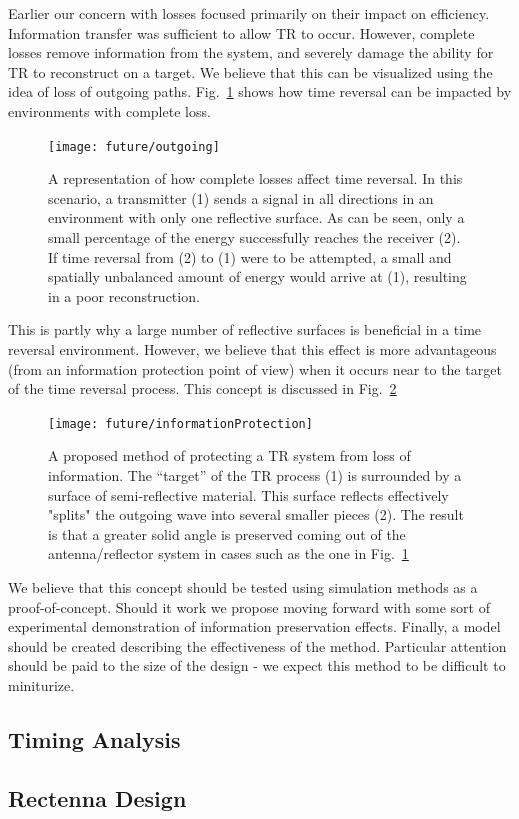 Earlier our concern with losses focused primarily on their impact on efficiency. Information transfer was sufficient to allow TR to occur. However, complete losses remove information from the system, and severely damage the ability for TR to reconstruct on a target. We believe that this can be visualized using the idea of loss of outgoing paths. Fig.~\ref{fig:outgo} shows how time reversal can be impacted by environments with complete loss.

\begin{figure}[h]
\texttt{[image: future/outgoing]}
\caption[Example of information loss on time reversal efficacy]{A representation of how complete losses affect time reversal. In this scenario, a transmitter (1) sends a signal in all directions in an environment with only one reflective surface. As can be seen, only a small percentage of the energy successfully reaches the receiver (2). If time reversal from (2) to (1) were to be attempted, a small and spatially unbalanced amount of energy would arrive at (1), resulting in a poor reconstruction.}
\label{fig:outgo}
\end{figure}

This is partly why a large number of reflective surfaces is beneficial in a time reversal environment. However, we believe that this effect is more advantageous (from an information protection point of view) when it occurs near to the target of the time reversal process. This concept is discussed in Fig.~\ref{fig:infoProtection}

\begin{figure}[h]
\texttt{[image: future/informationProtection]}
\caption[Proposed TR information protection system]{A proposed method of protecting a TR system from loss of information. The ``target'' of the TR process (1) is surrounded by a surface of semi-reflective material. This surface reflects effectively "splits" the outgoing wave into several smaller pieces (2). The result is that a greater solid angle is preserved coming out of the antenna/reflector system in cases such as the one in Fig.~\ref{fig:outgo}}
\label{fig:infoProtection}
\end{figure}

We believe that this concept should be tested using simulation methods as a proof-of-concept. Should it work we propose moving forward with some sort of experimental demonstration of information preservation effects. Finally, a model should be created describing the effectiveness of the method. Particular attention should be paid to the size of the design - we expect this method to be difficult to miniturize.

\subsection{Timing Analysis}

\subsection{Rectenna Design}
